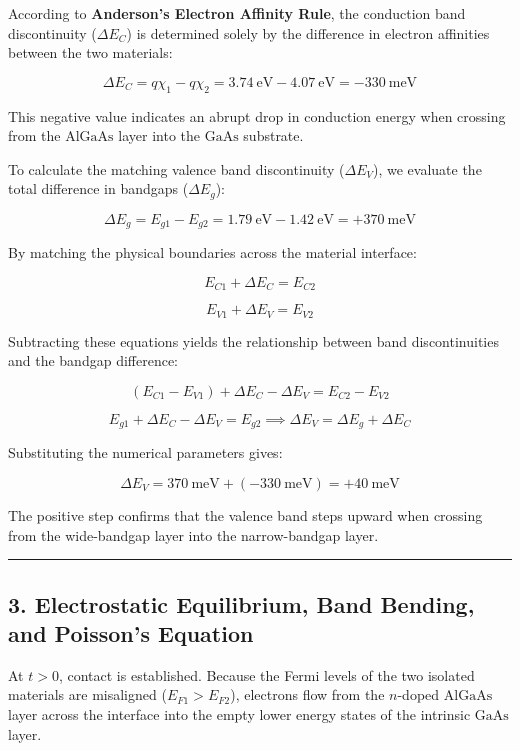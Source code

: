 \documentclass[
]{article}
\begin{document}
According to \textbf{Anderson's Electron Affinity Rule}, the conduction
band discontinuity (\(\Delta E_C\)) is determined solely by the
difference in electron affinities between the two materials:

\[\Delta E_C = q\chi_1 - q\chi_2 = 3.74\ \text{eV} - 4.07\ \text{eV} = -330\ \text{meV}\]

This negative value indicates an abrupt drop in conduction energy when
crossing from the \(\text{AlGaAs}\) layer into the \(\text{GaAs}\)
substrate.

To calculate the matching valence band discontinuity (\(\Delta E_V\)),
we evaluate the total difference in bandgaps (\(\Delta E_g\)):

\[\Delta E_g = E_{g1} - E_{g2} = 1.79\ \text{eV} - 1.42\ \text{eV} = +370\ \text{meV}\]

By matching the physical boundaries across the material interface:

\[E_{C1} + \Delta E_C = E_{C2}\]

\[E_{V1} + \Delta E_V = E_{V2}\]

Subtracting these equations yields the relationship between band
discontinuities and the bandgap difference:

\[(E_{C1} - E_{V1}) + \Delta E_C - \Delta E_V = E_{C2} - E_{V2}\]

\[E_{g1} + \Delta E_C - \Delta E_V = E_{g2} \implies \Delta E_V = \Delta E_g + \Delta E_C\]

Substituting the numerical parameters gives:

\[\Delta E_V = 370\ \text{meV} + (-330\ \text{meV}) = +40\ \text{meV}\]

The positive step confirms that the valence band steps upward when
crossing from the wide-bandgap layer into the narrow-bandgap layer.

\begin{center}\rule{0.5\linewidth}{0.5pt}\end{center}

\subsection{3. Electrostatic Equilibrium, Band Bending, and Poisson's
Equation}\label{electrostatic-equilibrium-band-bending-and-poissons-equation}

At \(t > 0\), contact is established. Because the Fermi levels of the
two isolated materials are misaligned (\(E_{F1} > E_{F2}\)), electrons
flow from the \(n\)-doped \(\text{AlGaAs}\) layer across the interface
into the empty lower energy states of the intrinsic \(\text{GaAs}\)
layer.
\end{document}
